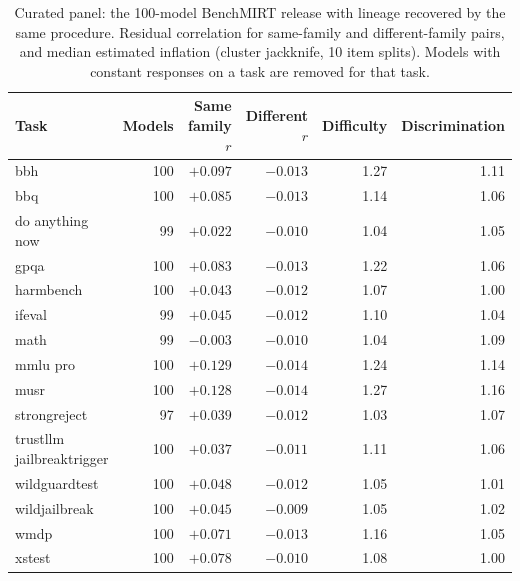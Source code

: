 \begin{table}[!htb]\centering\footnotesize\setlength{\tabcolsep}{3.5pt}
\caption{Curated panel: the 100-model BenchMIRT release with lineage recovered by the same procedure. Residual correlation for same-family and different-family pairs, and median estimated inflation (cluster jackknife, 10 item splits). Models with constant responses on a task are removed for that task.}\label{tab:second}
\begin{tabular}{lrrrrr}
\toprule
Task & Models & Same family $r$ & Different $r$ & Difficulty & Discrimination\\
\midrule
bbh & 100 & $+0.097$ & $-0.013$ & 1.27 & 1.11\\
bbq & 100 & $+0.085$ & $-0.013$ & 1.14 & 1.06\\
do anything now & 99 & $+0.022$ & $-0.010$ & 1.04 & 1.05\\
gpqa & 100 & $+0.083$ & $-0.013$ & 1.22 & 1.06\\
harmbench & 100 & $+0.043$ & $-0.012$ & 1.07 & 1.00\\
ifeval & 99 & $+0.045$ & $-0.012$ & 1.10 & 1.04\\
math & 99 & $-0.003$ & $-0.010$ & 1.04 & 1.09\\
mmlu pro & 100 & $+0.129$ & $-0.014$ & 1.24 & 1.14\\
musr & 100 & $+0.128$ & $-0.014$ & 1.27 & 1.16\\
strongreject & 97 & $+0.039$ & $-0.012$ & 1.03 & 1.07\\
trustllm jailbreaktrigger & 100 & $+0.037$ & $-0.011$ & 1.11 & 1.06\\
wildguardtest & 100 & $+0.048$ & $-0.012$ & 1.05 & 1.01\\
wildjailbreak & 100 & $+0.045$ & $-0.009$ & 1.05 & 1.02\\
wmdp & 100 & $+0.071$ & $-0.013$ & 1.16 & 1.05\\
xstest & 100 & $+0.078$ & $-0.010$ & 1.08 & 1.00\\
\bottomrule
\end{tabular}
\end{table}
